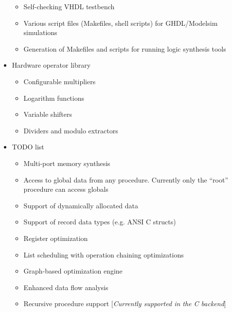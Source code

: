 \documentclass[a4paper]{article}
\begin{document}
\begin{itemize}
\begin{itemize}
\item Self-checking VHDL testbench

\item Various script files (Makefiles, shell scripts) for GHDL/Modelsim
simulations

\item Generation of Makefiles and scripts for running logic synthesis tools

\end{itemize}

\item Hardware operator library
%
\begin{itemize}

\item Configurable multipliers

\item Logarithm functions

\item Variable shifters

\item Dividers and modulo extractors

\end{itemize}

\item TODO list
%
\begin{itemize}

\item Multi-port memory synthesis

\item Access to global data from any procedure. Currently only the ``root''
procedure can access globals

\item Support of dynamically allocated data

\item Support of record data types (e.g. ANSI C structs)

\item Register optimization

\item List scheduling with operation chaining optimizations

\item Graph-based optimization engine

\item Enhanced data flow analysis

\item Recursive procedure support {[}\emph{Currently supported in the C backend}{]}

\end{itemize}

\end{itemize}
\end{document}
